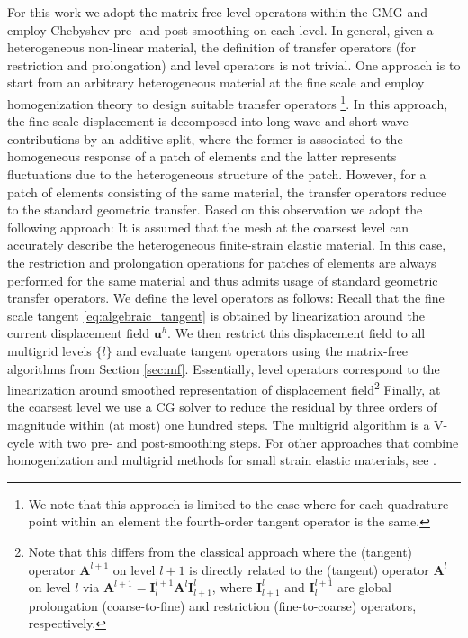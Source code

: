 \documentclass[preprint,12pt,times]{elsarticle}
\def\gz  #1{           \mbox{$\boldsymbol{#1}$}}
\begin{document}
For this work we adopt the matrix-free level operators within the GMG and employ Chebyshev pre- and post-smoothing on each level. In general, given a heterogeneous non-linear material, the definition of transfer operators (for restriction and prolongation) and level operators is not trivial. One approach is to start from an arbitrary heterogeneous material at the fine scale and employ homogenization theory \cite{Suquet1987, Hill1972,Hashin1983,Castaneda1997} to design suitable transfer operators \cite{Miehe2007}\footnote{
  We note that this approach is limited to the case where for each quadrature point within an element the fourth-order tangent operator is the same.
}.
In this approach, the fine-scale displacement is decomposed into long-wave and short-wave contributions by an additive split, where the former is associated to the homogeneous response of a patch of elements and the latter represents fluctuations due to the heterogeneous structure of the patch. However, for a patch of elements consisting of the same material, the transfer operators reduce to the standard geometric transfer. Based on this observation we adopt the following approach: It is assumed that the mesh at the coarsest level can accurately describe the heterogeneous finite-strain elastic material. In this case, the restriction and prolongation operations for patches of elements are always performed for the same material and thus admits usage of standard geometric transfer operators. We define the level operators as follows: Recall that the fine scale tangent \eqref{eq:algebraic_tangent} is obtained by linearization around the current displacement field $\gz u^h$. We then restrict this displacement field to all multigrid levels $\{l\}$ and evaluate tangent operators using the matrix-free algorithms from Section \ref{sec:mf}. Essentially, level operators correspond to the linearization around smoothed representation of displacement field\footnote{
Note that this differs from the classical approach where the (tangent) operator $\gz A^{l+1}$ on level $l+1$ is directly related to the (tangent) operator $\gz A^{l}$ on level $l$ via $\gz A^{l+1}=\gz I^{l+1}_{l} \gz A^l \gz I^l_{l+1}$, where $\gz I^l_{l+1}$ and $\gz I^{l+1}_l$ are global prolongation (coarse-to-fine) and restriction (fine-to-coarse) operators, respectively.
}
Finally, at the coarsest level we use a CG solver to reduce the residual by three orders of magnitude within (at most) one hundred steps.
The multigrid algorithm is a V-cycle with two pre- and post-smoothing steps. For other approaches that combine homogenization and multigrid methods for small strain elastic materials, see \cite{Bayreuther2003,Fish1995}.
\end{document}
